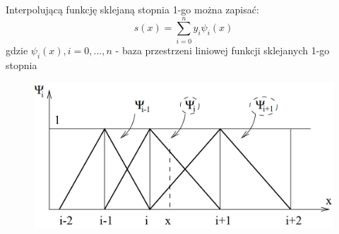    \begin{frame}
   		\begin{exampleblock}{}
   			Interpolującą funkcję sklejaną stopnia 1-go można zapisać:
            \[
            	s(x)=\sum_{i=0}^{n}y_{i}\psi_{i}(x)
            \]
            gdzie $\psi_{i}(x), i=0,...,n$ - baza przestrzeni liniowej funkcji sklejanych
            1-go stopnia
   		\end{exampleblock}
        \begin{figure}[h]
			\includegraphics[width=.65\linewidth]{img/4/spline_img_3}
		\end{figure}
   \end{frame}
    
    
    
    
    
    
    
    
    
    
    
    
    
    
    
    
    
    